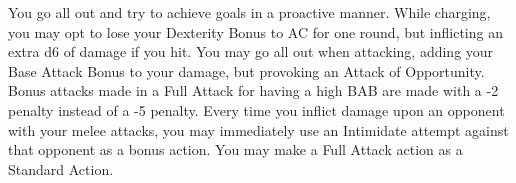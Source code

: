 {You go all out and try to achieve goals in a proactive manner.}
{While charging, you may opt to lose your Dexterity Bonus to AC for one round, but inflicting an extra d6 of damage if you hit.}
{You may go all out when attacking, adding your Base Attack Bonus to your damage, but provoking an Attack of Opportunity.}
{Bonus attacks made in a Full Attack for having a high BAB are made with a -2 penalty instead of a -5 penalty.}
{Every time you inflict damage upon an opponent with your melee attacks, you may immediately use an Intimidate attempt against that opponent as a bonus action.}
{You may make a Full Attack action as a Standard Action.}